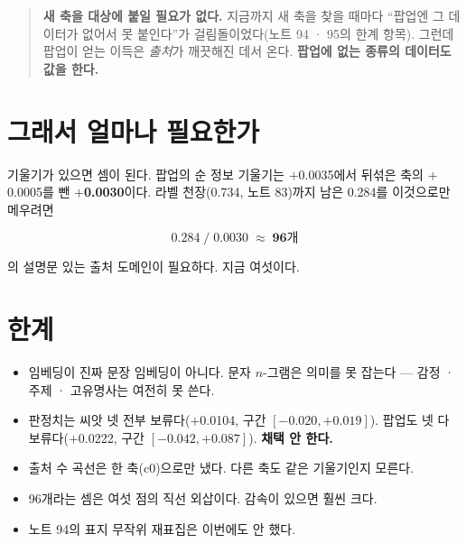 \documentclass[10pt]{article}
\begin{document}

\begin{quote}\fontsize{9.5}{11.5}\selectfont
\textbf{새 축을 대상에 붙일 필요가 없다.} 지금까지 새 축을 찾을 때마다 ``팝업엔
그 데이터가 없어서 못 붙인다''가 걸림돌이었다(노트 94 · 95의 한계 항목).
그런데 팝업이 얻는 이득은 \emph{출처}가 깨끗해진 데서 온다. \textbf{팝업에
없는 종류의 데이터도 값을 한다.}
\end{quote}

\section{그래서 얼마나 필요한가}

기울기가 있으면 셈이 된다. 팝업의 순 정보 기울기는 $+$0.0035에서 뒤섞은 축의
$+$0.0005를 뺀 \textbf{$+$0.0030}이다. 라벨 천장(0.734, 노트 83)까지 남은
0.284를 이것으로만 메우려면

\[ 0.284 \;/\; 0.0030 \;\approx\; \textbf{96개} \]

의 설명문 있는 출처 도메인이 필요하다. 지금 여섯이다.


\section{한계}

\begin{itemize}[leftmargin=1.1em,itemsep=0.15em]
\item 임베딩이 진짜 문장 임베딩이 아니다. 문자 $n$-그램은 의미를 못 잡는다 ---
      감정 · 주제 · 고유명사는 여전히 못 쓴다.
\item 판정치는 씨앗 넷 전부 보류다($+$0.0104, 구간 $[-0.020, +0.019]$).
      팝업도 넷 다 보류다($+$0.0222, 구간 $[-0.042, +0.087]$). \textbf{채택
      안 한다.}
\item 출처 수 곡선은 한 축(c0)으로만 냈다. 다른 축도 같은 기울기인지 모른다.
\item 96개라는 셈은 여섯 점의 직선 외삽이다. 감속이 있으면 훨씬 크다.
\item 노트 94의 표지 무작위 재표집은 이번에도 안 했다.
\end{itemize}
\end{document}
